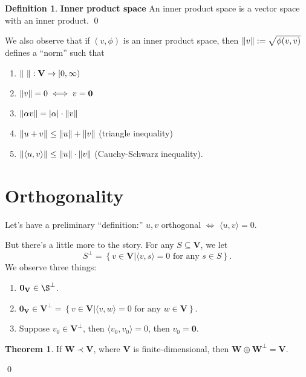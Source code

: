 \documentclass{book}
\theoremstyle{definition}
\newtheorem{defn}{Definition}[section]
\newtheorem{thm}{Theorem}[section]
\newcommand{\V}{\mathbf{V}}
\newcommand{\W}{\mathbf{W}}
\newcommand{\la}{\langle}
\newcommand{\ra}{\rangle}
\begin{document}
\begin{defn}\textbf{Inner product space} An inner product space is a vector space with an inner product. 
	\qed
\end{defn}



We also observe that if $(v,\phi)$ is an inner product space, then $\norm{v} := \sqrt{\phi(v,v)}$ defines a ``norm'' such that
\begin{enumerate}
	\item $\norm{\,\,} : \V \to [0,\infty)$\\
	\item $\norm{v} = 0 \iff v = \mathbf{0}$\\
	\item $\norm{\alpha v} = \abs{\alpha}\cdot \norm{v}$\\
	\item $\norm{u + v} \leq \norm{u} + \norm{v}$ (triangle inequality)\\
	\item $\norm{\la u,v \ra} \leq \norm{u}\cdot \norm{v}$ (Cauchy-Schwarz inequality).
\end{enumerate}














\section{Orthogonality}

Let's have a preliminary ``definition:'' $u,v$ orthogonal $\iff$ $\la u,v\ra = 0$.

But there's a little more to the story. For any $S \subseteq \V$, we let $$S^\perp = \left\{ v\in \V \big\vert \la v,s \ra = 0 \text{ for any } s \in S \right\}.$$
We observe three things:
\begin{enumerate}
	\item $\mathbf{0}_\V \in \S^\perp$.
	\item $\mathbf{0}_\V \in \V^\perp = \left\{ v\in \V \big\vert \la v,w\ra =0 \text{ for any } w\in \V \right\}$.
	\item Suppose $v_0 \in \V^\perp$, then $\la v_0,v_0\ra = 0$, then $v_0 = \mathbf{0}$. 
\end{enumerate}

\begin{thm}
	If $\W \prec \V$, where $\V$ is finite-dimensional, then $\W \oplus \W^\perp = \V$.
\end{thm}\qed
\end{document}
